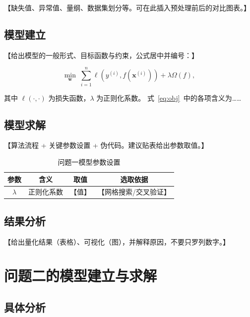 \documentclass[withoutpreface,bwprint]{cumcmthesis}
\begin{document}
【缺失值、异常值、量纲、数据集划分等。可在此插入预处理前后的对比图表。】

\subsection{模型建立}

【给出模型的一般形式、目标函数与约束，公式居中并编号：】

\begin{equation}
    \min_{\boldsymbol{w}} \; \sum_{i=1}^{n} \ell\!\left(y^{(i)}, f(\boldsymbol{x}^{(i)})\right)
    + \lambda \Omega(f),
    \label{eq:obj}
\end{equation}

其中 $\ell(\cdot,\cdot)$ 为损失函数，$\lambda$ 为正则化系数。
式~\eqref{eq:obj}~中的各项含义为……

\subsection{模型求解}

【算法流程 + 关键参数设置 + 伪代码。建议贴表给出参数取值。】

\begin{table}[H]
    \centering
    \caption{问题一模型参数设置}
    \label{tab:p1-params}
    \begin{tabular}{cccc}
        \toprule
        参数 & 含义 & 取值 & 选取依据 \\
        \midrule
        $\lambda$ & 正则化系数 & 【值】 & 【网格搜索/交叉验证】 \\
        \bottomrule
    \end{tabular}
\end{table}

\subsection{结果分析}

【给出量化结果（表格）、可视化（图），并解释原因，不要只罗列数字。】

\newpage
\section{问题二的模型建立与求解}

\subsection{具体分析}
\end{document}
